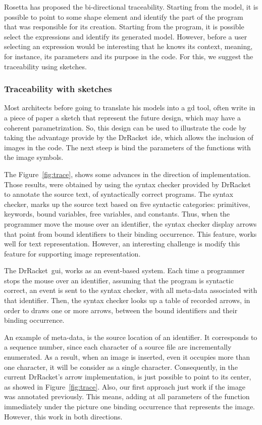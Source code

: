 Rosetta has proposed the bi-directional traceability. Starting from the model, it is possible to point to some shape element and identify the part of the program that was responsible for its creation. Starting from the program, it is possible select the expressions and identify its generated model. However, before a user selecting an expression would be interesting that he knows its context, meaning, for instance, its parameters and its purpose in the code. For this, we suggest the traceability using sketches.

\subsubsection{Traceability with sketches}

Most architects before going to translate his models into a \ac{gd} tool, often write in a piece of paper a sketch that represent the future design, which may have a coherent parametrization. So, this design can be used to illustrate the code by taking the advantage provide by the DrRacket~\ac{ide}, which allows the inclusion of images in the code. The next steep is bind the parameters of the functions with the image symbols.


The Figure~\ref{fig:trace}, shows some advances in the direction of implementation. Those results, were obtained by using the syntax checker provided by DrRacket to annotate the source text, of syntactically correct programs. The syntax checker, marks up the source text based on five syntactic categories: primitives, keywords, bound variables, free variables, and constants. Thus, when the programmer move the mouse over an identifier, the syntax checker display arrows that point from bound identifiers to their binding occurrence. This feature, works well for text representation. However, an interesting challenge is modify this feature for supporting image representation.

The DrRacket~\ac{gui}, works as an event-based system. Each time a programmer stops the mouse over an identifier, assuming that the program is syntactic correct, an event is sent to the syntax checker, with all meta-data associated with that identifier. Then, the syntax checker looks up a table of recorded arrows, in order to draws one or more arrows, between the bound identifiers and their binding occurrence. 

An example of meta-data, is the source location of an identifier. It corresponds to a sequence number, since each character of a source file are incrementally enumerated. As a result, when an image is inserted, even it occupies more than one character, it will be consider as a single character. Consequently, in the current DrRacket's arrow implementation, is just possible to point to its center, as showed in Figure~\ref{fig:trace}. Also, our first approach just work if the image was annotated previously. This means, adding at all parameters of the function immediately under the picture one binding occurrence that represents the image. However, this work in both directions.

